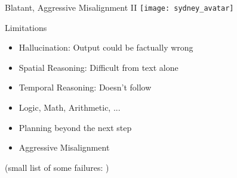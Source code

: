 \begin{frame}[c]{Blatant, Aggressive Misalignment II}
    \texttt{[image: sydney\_avatar]} \\
    \small
\end{frame}

\begin{frame}[c]{Limitations}
    \large
    \begin{itemize}[<+(1)->]
        \item Hallucination: Output could be factually wrong
        \item Spatial Reasoning: Difficult from text alone
        \item Temporal Reasoning: Doesn't follow
        \item Logic, Math, Arithmetic, ...
        \item Planning beyond the next step
        \item Aggressive Misalignment
    \end{itemize}
    \pause
    \normalsize
    (small list of some failures: \cite{borji_categorical_2023})
\end{frame}
